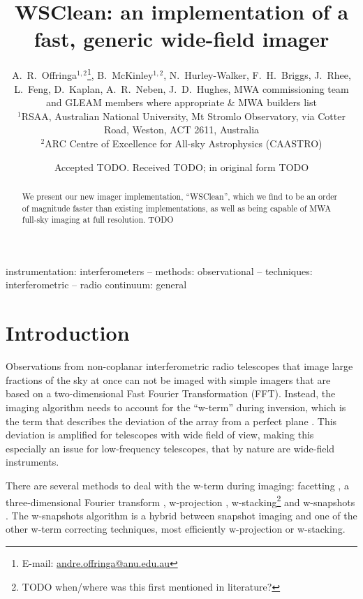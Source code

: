 \documentclass[useAMS,usenatbib]{mn2e}
\title[WSClean: a fast, generic wide-field imager]{WSClean: an implementation of a fast, generic wide-field imager}
\author[A.~R.~Offringa et al.]{A.~R.~Offringa$^{1,2}$\thanks{E-mail:
\url{andre.offringa@anu.edu.au}}, B.~McKinley$^{1,2}$, N.~Hurley-Walker, 
F.~H.~Briggs, \newauthor
J.~Rhee, L.~Feng, D.~Kaplan, A.~R.~Neben, J.~D.~Hughes, MWA commissioning team\newauthor
and GLEAM members where appropriate \& MWA builders list
\\
$^{1}$RSAA, Australian National University, Mt Stromlo Observatory, via Cotter Road, Weston, ACT 2611, Australia \\
$^{2}$ARC Centre of Excellence for All-sky Astrophysics (CAASTRO) \\
}
\begin{document}
\date{Accepted TODO. Received TODO; in original form TODO}
\pagerange{\pageref{firstpage}--\pageref{lastpage}}

\label{firstpage}
\maketitle

\begin{abstract}
We present our new imager implementation, ``WSClean'', which we find to be an order of magnitude faster than existing implementations, as well as being capable of MWA full-sky imaging at full resolution.
TODO
\end{abstract}

\begin{keywords}
instrumentation: interferometers -- methods: observational -- techniques: interferometric -- radio continuum: general
\end{keywords}

\section{Introduction}

Observations from non-coplanar interferometric radio telescopes that image large fractions of the sky at once can not be imaged with simple imagers that are based on a two-dimensional Fast Fourier Transformation (FFT). Instead, the imaging algorithm needs to account for the ``w-term'' during inversion, which is the term that describes the deviation of the array from a perfect plane \citep{perley-noncoplanar-arrays}. This deviation is amplified for telescopes with wide field of view, making this especially an issue for low-frequency telescopes, that by nature are wide-field instruments.

There are several methods to deal with the w-term during imaging: facetting \citep{facetting-cornwell}, a three-dimensional Fourier transform \citep{perley-noncoplanar-arrays}, w-projection \citep{wprojection-cornwell}, w-stacking\footnote{TODO when/where was this first mentioned in literature?} \citep{widefield-imaging-ska-cornwell} and w-snapshots \citep{widefield-imaging-ska-cornwell}. The w-snapshots algorithm is a hybrid between snapshot imaging and one of the other w-term correcting techniques, most efficiently w-projection or w-stacking.
\end{document}
